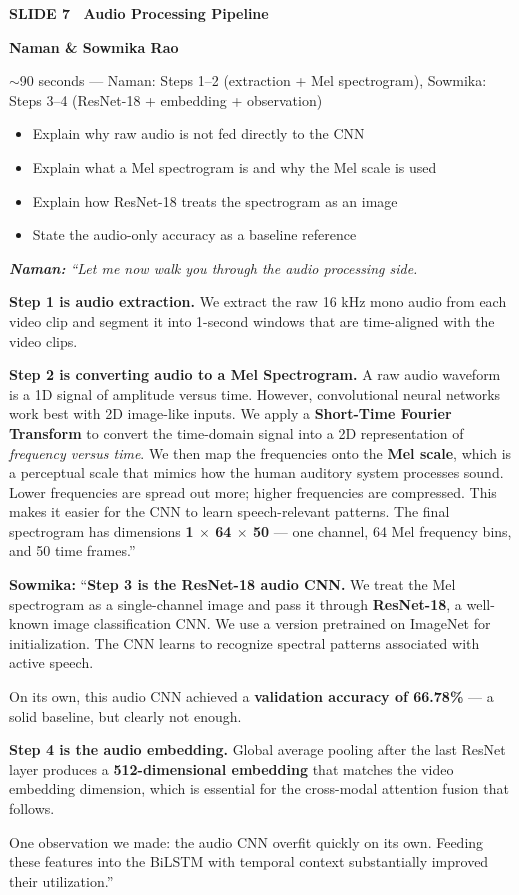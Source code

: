 \documentclass[11pt, a4paper]{article}
\newcommand{\slideheading}[3]{%
  \vspace{0.6cm}
  \begin{tcolorbox}[slidebox]
    \textbf{\color{NavyBlue}SLIDE #1 \textemdash\ #2}\\[2pt]
    \begin{tcolorbox}[presenterbox, title=Presenter(s)]
      \color{AccBlue}\bfseries #3
    \end{tcolorbox}
  \end{tcolorbox}
}
\newcommand{\timing}[1]{%
  \begin{tcolorbox}[timebox, title=Suggested Time]
    \color{AccOrange} #1
  \end{tcolorbox}
}
\newcommand{\keypoints}[1]{%
  \begin{tcolorbox}[keybox, title=Key Points to Cover]
    #1
  \end{tcolorbox}
}
\newcommand{\script}[1]{%
  \begin{mdframed}[
    backgroundcolor=white,
    linecolor=MidText!40,
    linewidth=0.5pt,
    leftmargin=0pt,
    rightmargin=0pt,
    innerleftmargin=10pt,
    innerrightmargin=8pt,
    innertopmargin=8pt,
    innerbottommargin=8pt,
    roundcorner=3pt
  ]
  \itshape\color{MidText}
  #1
  \end{mdframed}
}
\begin{document}
\slideheading{7}{Audio Processing Pipeline}{Naman \& Sowmika Rao}

\timing{$\sim$90 seconds --- Naman: Steps 1--2 (extraction + Mel spectrogram), Sowmika: Steps 3--4 (ResNet-18 + embedding + observation)}

\keypoints{%
\begin{itemize}[leftmargin=*, itemsep=2pt]
  \item Explain why raw audio is not fed directly to the CNN
  \item Explain what a Mel spectrogram is and why the Mel scale is used
  \item Explain how ResNet-18 treats the spectrogram as an image
  \item State the audio-only accuracy as a baseline reference
\end{itemize}
}

\script{%
\textbf{Naman:} ``Let me now walk you through the audio processing side.

\textbf{Step 1 is audio extraction.} We extract the raw 16 kHz mono audio from each video clip and segment it into 1-second windows that are time-aligned with the video clips.

\textbf{Step 2 is converting audio to a Mel Spectrogram.} A raw audio waveform is a 1D signal of amplitude versus time. However, convolutional neural networks work best with 2D image-like inputs. We apply a \textbf{Short-Time Fourier Transform} to convert the time-domain signal into a 2D representation of \textit{frequency versus time}. We then map the frequencies onto the \textbf{Mel scale}, which is a perceptual scale that mimics how the human auditory system processes sound. Lower frequencies are spread out more; higher frequencies are compressed. This makes it easier for the CNN to learn speech-relevant patterns. The final spectrogram has dimensions \textbf{1 $\times$ 64 $\times$ 50} --- one channel, 64 Mel frequency bins, and 50 time frames.''

\textbf{Sowmika:} ``\textbf{Step 3 is the ResNet-18 audio CNN.} We treat the Mel spectrogram as a single-channel image and pass it through \textbf{ResNet-18}, a well-known image classification CNN. We use a version pretrained on ImageNet for initialization. The CNN learns to recognize spectral patterns associated with active speech.

On its own, this audio CNN achieved a \textbf{validation accuracy of 66.78\%} --- a solid baseline, but clearly not enough.

\textbf{Step 4 is the audio embedding.} Global average pooling after the last ResNet layer produces a \textbf{512-dimensional embedding} that matches the video embedding dimension, which is essential for the cross-modal attention fusion that follows.

One observation we made: the audio CNN overfit quickly on its own. Feeding these features into the BiLSTM with temporal context substantially improved their utilization.''
}
\end{document}
